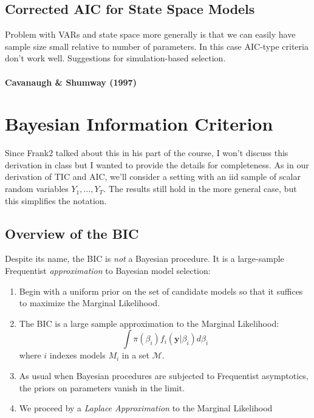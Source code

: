 \documentclass[12pt]{article}
\theoremstyle{definition}
\begin{document}
\subsection{Corrected AIC for State Space Models}
Problem with VARs and state space more generally is that we can easily have sample size small relative to number of parameters. In this case AIC-type criteria don't work well. Suggestions for simulation-based selection.

\paragraph{Cavanaugh \& Shumway (1997)} 

\paragraph{}
 


\section{Bayesian Information Criterion}
Since Frank2 talked about this in his part of the course, I won't discuss this derivation in class but I wanted to provide the details for completeness. As in our derivation of TIC and AIC, we'll consider a setting with an iid sample of scalar random variables $Y_1, \hdots, Y_T$. The results still hold in the more general case, but this simplifies the notation. 

\subsection{Overview of the BIC}
Despite its name, the BIC is \emph{not} a Bayesian procedure. It is a large-sample Frequentist \emph{approximation} to Bayesian model selection:
	\begin{enumerate}
		\item Begin with a uniform prior on the set of candidate models so that it suffices to maximize the Marginal Likelihood.
		\item The BIC is a large sample approximation to the Marginal Likelihood:
		$$\int \pi(\beta_i)f_i(\mathbf{y}|\beta_i)d\beta_i$$
		where $i$ indexes models $M_i$ in a set $\mathcal{M}$.
		\item As usual when Bayesian procedures are subjected to Frequentist asymptotics, the priors on parameters vanish in the limit.
		\item We proceed by a \emph{Laplace Approximation} to the Marginal Likelihood
	\end{enumerate}
\end{document}
